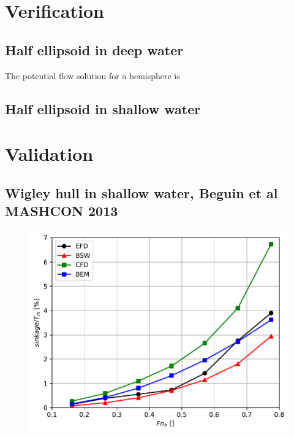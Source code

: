 \documentclass[]{book}
\begin{document}
\chapter{Verification}
\section{Half ellipsoid in deep water}
The potential flow solution for a hemisphere is \cite{newman2018}
\section{Half ellipsoid in shallow water}
\chapter{Validation}
\section{Wigley hull in shallow water, Beguin et al MASHCON 2013}
\begin{figure}
	\centering
	\includegraphics[width=0.9\linewidth]{figures/Example03_Beguin_MASHCON2013_WigleyHull}
	\caption{}
	\label{fig:example03beguinmashcon2013wigleyhull}
\end{figure}
\end{document}
